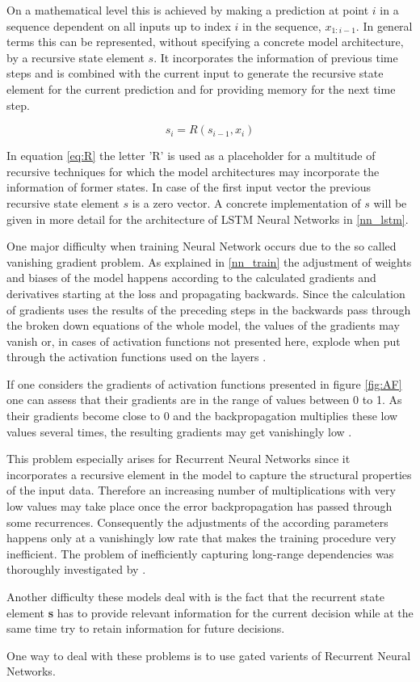 On a mathematical level this is achieved by making a prediction at point $i$ in a sequence dependent on all inputs up to index $i$ in the sequence, $x_{1:i-1}$. 
In general terms this can be represented, without specifying a concrete model architecture, by a recursive state element $s$. 
It incorporates the information of previous time steps and is combined with the current input to generate the recursive state element for the current prediction and for providing memory for the next time step.

\begin{equation}
\label{eq:R}
    s_i = R(s_{i-1}, x_i)
\end{equation}

In equation \ref{eq:R} the letter 'R' is used as a placeholder for a multitude of recursive techniques for which the model architectures may incorporate the information of former states. In case of the first input vector the previous recursive state element $s$ is a zero vector.
A concrete implementation of $s$ will be given in more detail for the architecture of LSTM Neural Networks in \ref{nn_lstm}.

One major difficulty when training Neural Network occurs due to the so called vanishing gradient problem. 
As explained in \ref{nn_train} the adjustment of weights and biases of the model happens according to the calculated gradients and derivatives starting at the loss and propagating backwards.
Since the calculation of gradients uses the results of the preceding steps in the backwards pass through the broken down equations of the whole model, 
the values of the gradients may vanish or, in cases of activation functions not presented here, explode when put through the activation functions used on the layers \citep{embedding2020pilehvar}.

If one considers the gradients of activation functions presented in figure \ref{fig:AF} one can assess that their gradients are in the range of values between 0 to 1. 
As their gradients become close to 0 and the backpropagation multiplies these low values several times, the resulting gradients may get vanishingly low \citep{tsoi1997recurrent}.

This problem especially arises for Recurrent Neural Networks since it incorporates a recursive element in the model to capture the structural properties of the input data.
Therefore an increasing number of multiplications with very low values may take place once the error backpropagation has passed through some recurrences. 
Consequently the adjustments of the according parameters happens only at a vanishingly low rate that makes the training procedure very inefficient. 
The problem of inefficiently capturing long-range dependencies was thoroughly investigated by \citet{gradient1994bengio}.

Another difficulty these models deal with is the fact that the recurrent state element \textbf{s} has to provide relevant information for the current decision while at the same time try to retain information for future decisions. 

One way to deal with these problems is to use gated varients of Recurrent Neural Networks.


